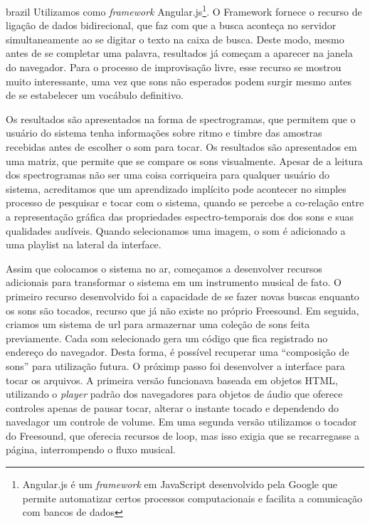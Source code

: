 \begin{otherlanguage*}{brazil}
Utilizamos como \emph{framework} Angular.js\footnote{Angular.js é um \emph{framework} em JavaScript desenvolvido pela Google que permite automatizar certos processos computacionais e facilita a comunicação com bancos de dados}. O Framework fornece o recurso de ligação de dados bidirecional, que faz com que a busca aconteça no servidor simultaneamente ao se digitar o texto na caixa de busca. Deste modo, mesmo antes de se completar uma palavra, resultados já começam a aparecer na janela do navegador. Para o processo de improvisação livre, esse recurso se mostrou muito interessante, uma vez que sons não esperados podem surgir mesmo antes de se estabelecer um vocábulo definitivo. 

Os resultados são apresentados na forma de spectrogramas, que permitem que o usuário do sistema tenha informações sobre ritmo e timbre das amostras recebidas antes de escolher o som para tocar. Os resultados são apresentados em uma matriz, que permite que se compare os sons visualmente. Apesar de a leitura dos spectrogramas não ser uma coisa corriqueira para qualquer usuário do sistema, acreditamos que um aprendizado implícito pode acontecer no simples processo de pesquisar e tocar com o sistema, quando se percebe a co-relação entre a representação gráfica das propriedades espectro-temporais dos dos sons e suas qualidades audíveis. Quando selecionamos uma imagem, o som é adicionado a uma playlist na lateral da interface.

 Assim que colocamos o sistema no ar, começamos a desenvolver recursos adicionais para transformar o sistema em um instrumento musical de fato. O primeiro recurso desenvolvido foi a capacidade de se fazer novas buscas enquanto os sons são tocados, recurso que já não existe no próprio Freesound. Em seguida, criamos um sistema de url para armazernar uma coleção de sons feita previamente. Cada som selecionado gera um código que fica registrado no endereço do navegador. Desta forma, é possível recuperar uma ``composição de sons'' para utilização futura. O próximp passo foi desenvolver a interface para tocar os arquivos. A primeira versão funcionava baseada em objetos HTML, utilizando o \emph{player} padrão dos navegadores para objetos de áudio que oferece controles apenas de pausar tocar, alterar o instante tocado e dependendo do navedagor um controle de volume. Em uma segunda versão utilizamos o tocador do Freesound, que oferecia recursos de loop, mas isso exigia que se recarregasse a página, interrompendo o fluxo musical. 


\end{otherlanguage*}
